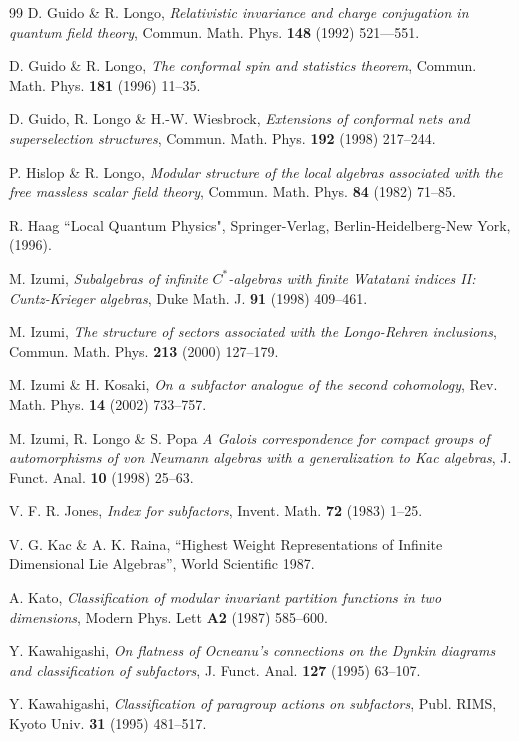 \documentclass[12pt]{article}
\begin{document}
{\begin{thebibliography}{99}
D. Guido \& R. Longo, 
{\it Relativistic invariance and
charge conjugation in quantum field theory}, 
Commun.  Math.  Phys.  {\bf 148} (1992) 521---551.

D. Guido \& R. Longo, {\it The conformal spin and statistics theorem},
Commun. Math.  Phys.  {\bf 181} (1996) 11--35.

D. Guido, R. Longo \& H.-W. Wiesbrock, {\it Extensions of conformal
nets and superselection structures}, Commun.  Math.  Phys.  {\bf 192}
(1998) 217--244.

P. Hislop \& R. Longo, {\it Modular structure of the local algebras
associated with the free massless scalar field theory},
Commun. Math. Phys. {\bf 84} (1982) 71--85.

 R. Haag ``Local Quantum Physics", Springer-Verlag,
Berlin-Heidelberg-New York, (1996).

 M. Izumi,
{\it Subalgebras of infinite $C^*$-algebras with
finite Watatani indices II: Cuntz-Krieger algebras},
Duke Math. J. {\bf 91} (1998) 409--461.

 M. Izumi,
{\it The structure of sectors associated with the Longo-Rehren
inclusions}, Commun. Math. Phys. {\bf 213} (2000) 127--179.

 M. Izumi \& H. Kosaki, 
{\it On a subfactor analogue of the second cohomology},
Rev. Math. Phys. {\bf 14} (2002) 733--757.

 M. Izumi, R. Longo \& S. Popa
{\it  A Galois correspondence for compact groups of automorphisms
of von Neumann algebras with a generalization to Kac algebras},
J. Funct. Anal. {\bf 10} (1998) 25--63.

V. F. R. Jones, {\it Index for subfactors}, Invent.  Math.  {\bf 72}
(1983) 1--25.

V. G. Kac \& A. K. Raina, 
``Highest Weight Representations of Infinite Dimensional Lie 
Algebras'', World Scientific 1987.

A. Kato, 
{\it Classification of modular invariant partition
functions in two dimensions},
Modern Phys. Lett {\bf A2} (1987) 585--600.

Y. Kawahigashi, 
{\it On flatness of Ocneanu's connections on the Dynkin diagrams
and classification of subfactors},
J. Funct. Anal. {\bf 127} (1995) 63--107.

Y. Kawahigashi,
{\it Classification of paragroup actions on subfactors},
Publ. RIMS, Kyoto Univ. {\bf 31} (1995) 481--517.


\end{thebibliography}}
\end{document}
